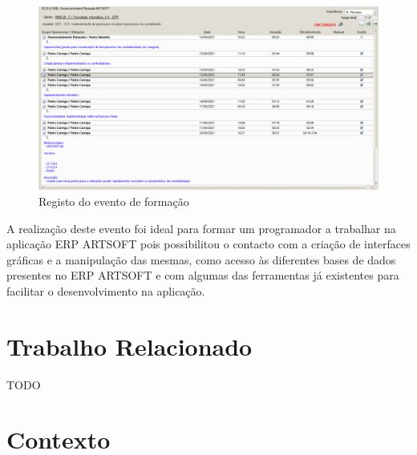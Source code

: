 \documentclass[sigplan]{acmart}
\begin{document}
\FloatBarrier
\begin{figure}[htbp]
	\centerline{\includegraphics[width=\linewidth]{figures/evento_formacao.png}}
	\caption{Registo do evento de formação}
	\label{fig2}
\end{figure}
\FloatBarrier
A realização deste evento foi ideal para formar um programador a trabalhar na aplicação ERP ARTSOFT pois possibilitou o contacto com a criação de interfaces gráficas e a manipulação das mesmas, como acesso às diferentes bases de dados presentes no ERP ARTSOFT e com algumas das ferramentas já existentes para facilitar o desenvolvimento na aplicação.
\section{Trabalho Relacionado} \label{sec:relatedwork}

TODO





\section{Contexto} \label{sec:data}
\end{document}
